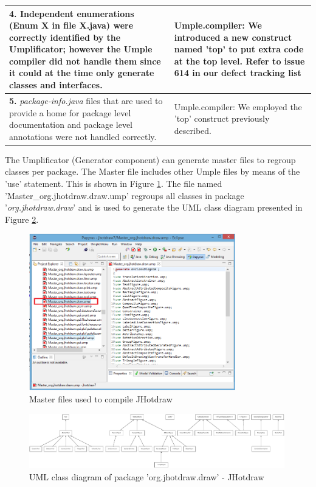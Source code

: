 \begin{table}[htbp]
\begin{tabularx}{\textwidth}{X|X}
\textbf{4.} Independent enumerations (Enum X in file X.java) were correctly identified by the Umplificator; however the Umple compiler did not handle them since it could at the time only generate classes and interfaces. 
  &  Umple.compiler: We introduced a new construct named 'top' to put extra code at the top level. Refer to issue 614 in our defect tracking list \cite{UmpleIssues} \\ \hline

\textbf{5.} \textit{package-info.java} files that are used to provide a home for package level documentation and package level annotations were not handled correctly.
  &  Umple.compiler: We employed the 'top' construct previously described.    
 \\ \hline
\end{tabularx}
\end{table}

The Umplificator (Generator component) can generate master files to regroup classes per package. The Master file includes other Umple files by means of the 'use' statement. This is shown in Figure \ref{fig:jhotdrawMasterDraw}. The file named 'Master\_org.jhotdraw.draw.ump' regroups all classes in package '\textit{org.jhotdraw.draw}' and is used to generate the UML class diagram presented in Figure  \ref{fig:jhotdrawUMLClass}.

\begin{figure}[h]
\centering
\includegraphics[width=0.80\textwidth]{Figures/jhotdrawMasterDraw.png} 
\caption{Master files used to compile JHotdraw}
\label{fig:jhotdrawMasterDraw}
\end{figure}

\newpage
\begin{figure}
\includegraphics[width=0.99\textwidth]{Figures/jhotdrawuml.pdf} 
\caption{UML class diagram of package 'org.jhotdraw.draw' -  JHotdraw}
\label{fig:jhotdrawUMLClass}
\end{figure}

